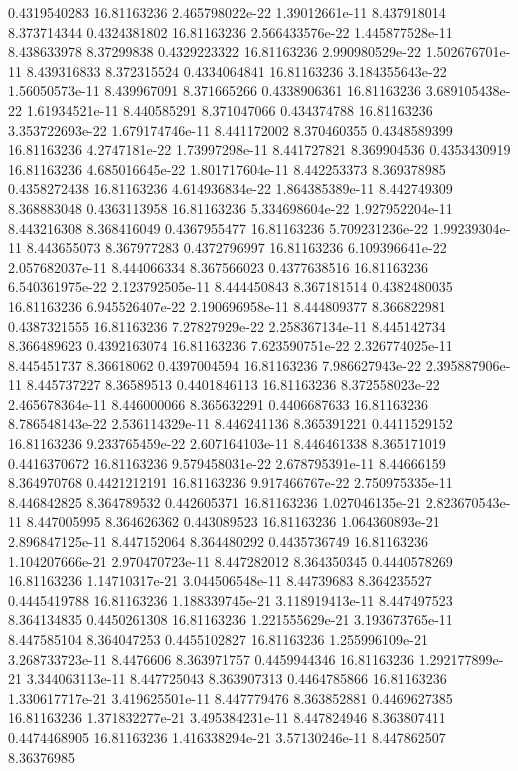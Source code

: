 {0.4319540283 16.81163236 2.465798022e-22 1.39012661e-11 8.437918014 8.373714344
0.4324381802 16.81163236 2.566433576e-22 1.445877528e-11 8.438633978 8.37299838
0.4329223322 16.81163236 2.990980529e-22 1.502676701e-11 8.439316833 8.372315524
0.4334064841 16.81163236 3.184355643e-22 1.56050573e-11 8.439967091 8.371665266
0.4338906361 16.81163236 3.689105438e-22 1.61934521e-11 8.440585291 8.371047066
0.434374788 16.81163236 3.353722693e-22 1.679174746e-11 8.441172002 8.370460355
0.4348589399 16.81163236 4.2747181e-22 1.73997298e-11 8.441727821 8.369904536
0.4353430919 16.81163236 4.685016645e-22 1.801717604e-11 8.442253373 8.369378985
0.4358272438 16.81163236 4.614936834e-22 1.864385389e-11 8.442749309 8.368883048
0.4363113958 16.81163236 5.334698604e-22 1.927952204e-11 8.443216308 8.368416049
0.4367955477 16.81163236 5.709231236e-22 1.99239304e-11 8.443655073 8.367977283
0.4372796997 16.81163236 6.109396641e-22 2.057682037e-11 8.444066334 8.367566023
0.4377638516 16.81163236 6.540361975e-22 2.123792505e-11 8.444450843 8.367181514
0.4382480035 16.81163236 6.945526407e-22 2.190696958e-11 8.444809377 8.366822981
0.4387321555 16.81163236 7.27827929e-22 2.258367134e-11 8.445142734 8.366489623
0.4392163074 16.81163236 7.623590751e-22 2.326774025e-11 8.445451737 8.36618062
0.4397004594 16.81163236 7.986627943e-22 2.395887906e-11 8.445737227 8.36589513
0.4401846113 16.81163236 8.372558023e-22 2.465678364e-11 8.446000066 8.365632291
0.4406687633 16.81163236 8.786548143e-22 2.536114329e-11 8.446241136 8.365391221
0.4411529152 16.81163236 9.233765459e-22 2.607164103e-11 8.446461338 8.365171019
0.4416370672 16.81163236 9.579458031e-22 2.678795391e-11 8.44666159 8.364970768
0.4421212191 16.81163236 9.917466767e-22 2.750975335e-11 8.446842825 8.364789532
0.442605371 16.81163236 1.027046135e-21 2.823670543e-11 8.447005995 8.364626362
0.443089523 16.81163236 1.064360893e-21 2.896847125e-11 8.447152064 8.364480292
0.4435736749 16.81163236 1.104207666e-21 2.970470723e-11 8.447282012 8.364350345
0.4440578269 16.81163236 1.14710317e-21 3.044506548e-11 8.44739683 8.364235527
0.4445419788 16.81163236 1.188339745e-21 3.118919413e-11 8.447497523 8.364134835
0.4450261308 16.81163236 1.221555629e-21 3.193673765e-11 8.447585104 8.364047253
0.4455102827 16.81163236 1.255996109e-21 3.268733723e-11 8.4476606 8.363971757
0.4459944346 16.81163236 1.292177899e-21 3.344063113e-11 8.447725043 8.363907313
0.4464785866 16.81163236 1.330617717e-21 3.419625501e-11 8.447779476 8.363852881
0.4469627385 16.81163236 1.371832277e-21 3.495384231e-11 8.447824946 8.363807411
0.4474468905 16.81163236 1.416338294e-21 3.57130246e-11 8.447862507 8.36376985
}
